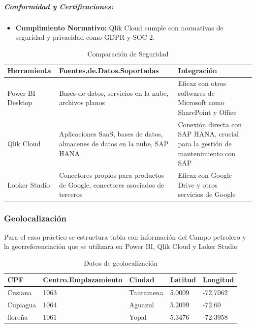\documentclass[
  11pt,
  bookmarksnumbered]{article}
\providecommand{\tightlist}{%
  \setlength{\itemsep}{0pt}\setlength{\parskip}{0pt}}
\begin{document}
\hypertarget{conformidad-y-certificaciones-2}{%
\subparagraph{Conformidad y Certificaciones:}\label{conformidad-y-certificaciones-2}}

\begin{itemize}
\tightlist
\item
  \textbf{Cumplimiento Normativo:} Qlik Cloud cumple con normativas de seguridad y privacidad como GDPR y SOC 2.
\end{itemize}

\begin{table}[H]

\caption{\label{tab:unnamed-chunk-22}Comparación de Seguridad}
\centering
\fontsize{9}{11}\selectfont
\begin{tabular}[t]{>{\raggedright\arraybackslash}p{10em}|>{\raggedright\arraybackslash}p{20em}|>{\raggedright\arraybackslash}p{20em}|>{}p{15em}}
\hline
Herramienta & Fuentes.de.Datos.Soportadas & Integración\\
\hline
Power BI Desktop & Bases de datos, servicios en la nube, archivos planos & Eficaz con otros softwares de Microsoft como SharePoint y Office\\
\hline
Qlik Cloud & Aplicaciones SaaS, bases de datos, almacenes de datos en la nube, SAP HANA & Conexión directa con SAP HANA, crucial para la gestión de mantenimiento con SAP\\
\hline
Looker Studio & Conectores propios para productos de Google, conectores asociados de terceros & Eficaz con Google Drive y otros servicios de Google\\
\hline
\end{tabular}
\end{table}

\hypertarget{geolocalizaciuxf3n}{%
\subsubsection{Geolocalización}\label{geolocalizaciuxf3n}}

Para el caso práctico se estructura tabla con información del Campo petrolero y la georreferenciación que se utilizara en Power BI, Qlik Cloud y Loker Studio

\begin{table}[H]

\caption{\label{tab:unnamed-chunk-23}Datos de geolocalización}
\centering
\fontsize{9}{11}\selectfont
\begin{tabular}[t]{l|l|l|l|l}
\hline
CPF & Centro.Emplazamiento & Ciudad & Latitud & Longitud\\
\hline
Cusiana & 1063 & Tauramena & 5.0009 & -72.7062\\
\hline
Cupiagua & 1064 & Aguazul & 5.2099 & -72.60\\
\hline
floreña & 1061 & Yopal & 5.3476 & -72.3958\\
\hline
\end{tabular}
\end{table}
\end{document}
